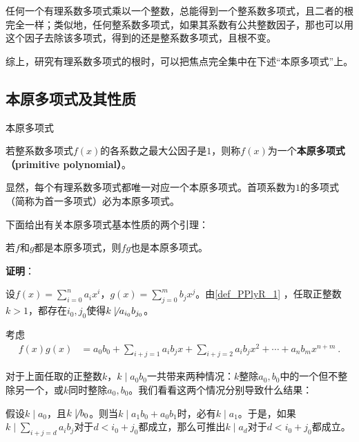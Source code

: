 

任何一个有理系数多项式乘以一个整数，总能得到一个整系数多项式，且二者的根完全一样；类似地，任何整系数多项式，如果其系数有公共整数因子，那也可以用这个因子去除该多项式，得到的还是整系数多项式，且根不变。

综上，研究有理系数多项式的根时，可以把焦点完全集中在下述“本原多项式”上。


\subsection{本原多项式及其性质}


\begin{definition}{本原多项式}\label{def_PPlyR_1}

若整系数多项式$f(x)$的各系数之最大公因子是$1$，则称$f(x)$为一个\textbf{本原多项式（primitive polynomial）}。

\end{definition}

显然，每个有理系数多项式都唯一对应一个本原多项式。首项系数为$1$的多项式（简称为首一多项式）必为本原多项式。

下面给出有关本原多项式基本性质的两个引理：

\begin{lemma}{}\label{lem_PPlyR_1}
若$f$和$g$都是本原多项式，则$fg$也是本原多项式。
\end{lemma}

\textbf{证明}：

设$f(x) = \sum_{i=0}^n a_ix^i$，$g(x) = \sum_{j=0}^m b_jx^j$。由\autoref{def_PPlyR_1} ，任取正整数$k>1$，都存在$i_0, j_0$使得$k\not\mid a_{i_0}b_{j_0}$。

考虑
\begin{equation}\label{eq_PPlyR_1}
\begin{aligned}
f(x)g(x) &= a_0b_0 + \sum_{i+j=1}a_ib_jx + \sum_{i+j=2}a_ib_jx^2+\cdots +a_nb_mx^{n+m}~.
\end{aligned}
\end{equation}

对于上面任取的正整数$k$，$k\mid a_0b_0$一共带来两种情况：$k$整除$a_0, b_0$中的一个但不整除另一个，或$k$同时整除$a_0, b_0$。我们看看这两个情况分别导致什么结果：

假设$k\mid a_0$，且$k\not\mid b_0$。则当$k\mid a_1b_0+a_0b_1$时，必有$k\mid a_1$。于是，如果$k\mid\sum_{i+j=d}a_ib_j$对于$d<i_0+j_0$都成立，那么可推出$k\mid a_d$对于$d<i_0+j_0$都成立。

